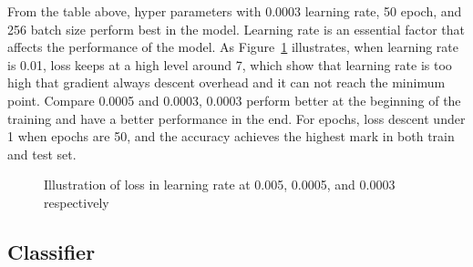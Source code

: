 \documentclass[runningheads]{llncs}
\begin{document}
From the table above, hyper parameters with 0.0003 learning rate, 50 epoch, and 256 batch size perform best in the model. Learning rate is an essential factor that affects the performance of the model. As Figure~\ref{fig8} illustrates, when learning rate is 0.01, loss keeps at a high level around 7, which show that learning rate is too high that gradient always descent overhead and it can not reach the minimum point. Compare 0.0005 and 0.0003, 0.0003 perform better at the beginning of the training and have a better performance in the end. For epochs, loss descent under 1 when epochs are 50, and the accuracy achieves the highest mark in both train and test set.
\begin{figure}[htbp]
	\centering
	\caption{Illustration of loss in learning rate at 0.005, 0.0005, and 0.0003 respectively}
	\label{fig8}
\end{figure}

\subsection{Classifier}
\end{document}
